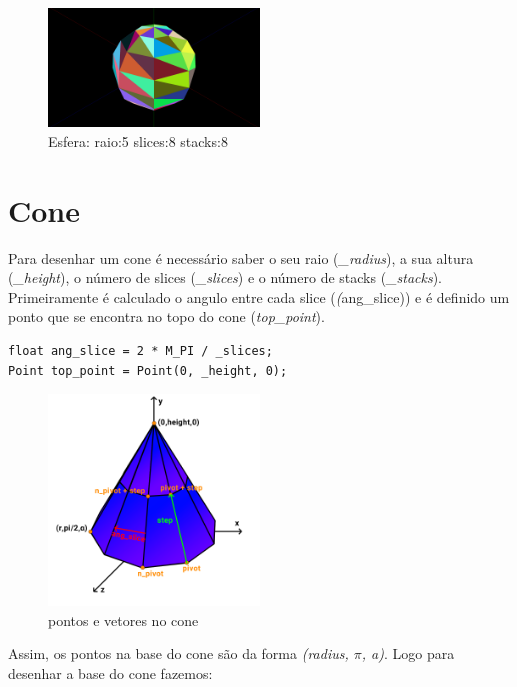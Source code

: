 \documentclass[a4paper]{report}
\begin{document}


\begin{figure}[H]
    \centering 
    \includegraphics[width=0.5\textwidth]{images/sphere.png}  
    \caption{Esfera: raio:5 slices:8 stacks:8}
    \label{fig:cilindro_render}
\end{figure}


\section{Cone}
Para desenhar um cone é necessário saber o seu raio (\textit{\_radius}), a sua
altura (\textit{\_height}), o número de slices (\textit{\_slices}) e o número de
stacks (\textit{\_stacks}).\\
Primeiramente é calculado o angulo entre cada slice (\textit(ang\_slice))
e é definido um ponto que se encontra no topo do cone (\textit{top\_point}).

\begin{lstlisting}
float ang_slice = 2 * M_PI / _slices;
Point top_point = Point(0, _height, 0);
\end{lstlisting}
\begin{figure}[H]
    \centering 
    \includegraphics[width=0.5\textwidth]{images/cone_vetores.png}  
    \caption{pontos e vetores no cone}
    \label{fig:cone_vetores}
\end{figure}

Assim, os pontos na base do cone são da forma \textit{(radius, $\pi$, a)}.
Logo para desenhar a base do cone fazemos:
\end{document}
